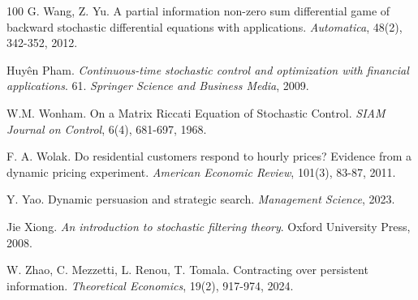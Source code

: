 \documentclass[a4paper,10pt]{article}
\theoremstyle{definition}
\theoremstyle{plain}
\numberwithin{equation}{section}
\begin{document}
\begin{thebibliography}{100}
G. Wang, Z. Yu. A partial information non-zero sum differential game of backward stochastic differential equations with applications. {\em Automatica}, 48(2), 342-352, 2012.

Huy\^en Pham. \emph{Continuous-time stochastic control and optimization with financial applications}. 61. {\em Springer Science and Business Media}, 2009.

W.M. Wonham. On a Matrix Riccati Equation of Stochastic Control. {\em SIAM Journal on Control}, 6(4), 681-697, 1968.

F. A. Wolak.  Do residential customers respond to hourly prices? Evidence from a dynamic pricing experiment. {\em American Economic Review}, 101(3), 83-87, 2011.

Y. Yao. Dynamic persuasion and strategic search. {\em Management Science}, 2023.

 Jie Xiong. {\em An introduction to stochastic filtering theory}. Oxford University Press, 2008.

W. Zhao, C. Mezzetti, L. Renou, T. Tomala. Contracting over persistent information. {\em Theoretical Economics}, 19(2), 917-974, 2024.

\end{thebibliography}

\appendix
\end{document}
